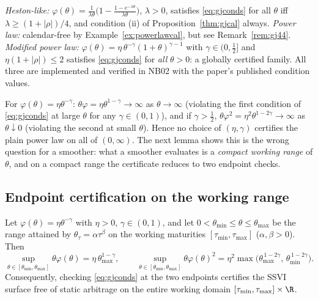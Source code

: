 \begin{example}\label{ex:phifamilies}
\emph{Heston-like:} $\varphi(\theta)=\frac{1}{\lambda\theta}
\bigl(1-\frac{1-e^{-\lambda\theta}}{\lambda\theta}\bigr)$, $\lambda>0$, satisfies
\eqref{eq:gjconds} for all $\theta$ iff $\lambda\ge(1+|\rho|)/4$, and condition (ii) of
Proposition~\ref{thm:gjcal} always. \emph{Power law:} calendar-free by
Example~\ref{ex:powerlawcal}, but see Remark~\ref{rem:gj44}. \emph{Modified power law:}
$\varphi(\theta)=\eta\,\theta^{-\gamma}(1+\theta)^{\gamma-1}$ with $\gamma\in(0,\tfrac12]$ and
$\eta(1+|\rho|)\le2$ satisfies \eqref{eq:gjconds} for \emph{all} $\theta>0$: a globally
certified family. All three are implemented and verified in NB02 with the paper's published
condition values.
\end{example}

\begin{remark}\label{rem:gj44}
For $\varphi(\theta)=\eta\theta^{-\gamma}$: $\theta\varphi=\eta\theta^{1-\gamma}\to\infty$ as
$\theta\to\infty$ (violating the first condition of \eqref{eq:gjconds} at large $\theta$ for
any $\gamma\in(0,1)$), and if $\gamma>\tfrac12$,
$\theta\varphi^2=\eta^2\theta^{1-2\gamma}\to\infty$ as $\theta\downarrow0$ (violating the
second at small $\theta$). Hence no choice of $(\eta,\gamma)$ certifies the plain power law on
all of $(0,\infty)$. The next lemma shows this is the wrong question for a smoother: what a
smoother evaluates is a \emph{compact working range} of $\theta$, and on a compact range the
certificate reduces to two endpoint checks.
\end{remark}

\subsection{Endpoint certification on the working range}

\begin{theorem}\label{lem:range}
Let $\varphi(\theta)=\eta\theta^{-\gamma}$ with $\eta>0$, $\gamma\in(0,1)$, and let
$0<\theta_{\min}\le\theta\le\theta_{\max}$ be the range attained by
$\theta_\tau=\alpha\tau^{\beta}$ on the working maturities $[\tau_{\min},\tau_{\max}]$
($\alpha,\beta>0$). Then
\[
\sup_{\theta\in[\theta_{\min},\theta_{\max}]}\theta\varphi(\theta)
=\eta\,\theta_{\max}^{1-\gamma},
\qquad
\sup_{\theta\in[\theta_{\min},\theta_{\max}]}\theta\varphi(\theta)^{2}
=\eta^{2}\max\bigl(\theta_{\max}^{\,1-2\gamma},\,\theta_{\min}^{\,1-2\gamma}\bigr).
\]
Consequently, checking \eqref{eq:gjconds} at the two endpoints certifies the SSVI surface free
of static arbitrage on the entire working domain $[\tau_{\min},\tau_{\max}]\times\R$.
\end{theorem}

